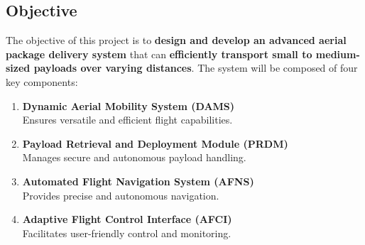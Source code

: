 \documentclass[12pt]{article}
\begin{document}
\subsection{Objective}
The objective of this project is to \textbf{design and develop an advanced aerial package delivery system} that can \textbf{efficiently transport small to medium-sized payloads over varying distances}. The system will be composed of four key components:
\begin{enumerate}
    \item \textbf{Dynamic Aerial Mobility System (DAMS)} \\
    Ensures versatile and efficient flight capabilities.
    \item \textbf{Payload Retrieval and Deployment Module (PRDM)} \\
    Manages secure and autonomous payload handling.
    \item \textbf{Automated Flight Navigation System (AFNS)} \\
    Provides precise and autonomous navigation.
    \item \textbf{Adaptive Flight Control Interface (AFCI)} \\
    Facilitates user-friendly control and monitoring.
\end{enumerate}
\end{document}
